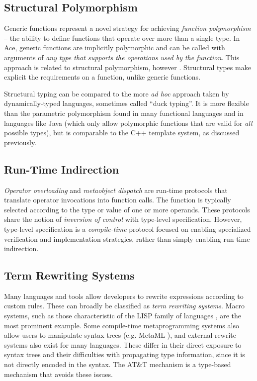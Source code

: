 \documentclass[9pt,preprint]{sigplanconf}
\begin{document}
\subsection{Structural Polymorphism}
Generic functions represent a novel strategy for achieving {\it function polymorphism} -- the ability to define functions that operate over more than a single type. In Ace, generic functions are implicitly polymorphic and can be called with arguments of {\it any type that supports the operations used by the function}. This approach is related to structural polymorphism, however \cite{malayeri2009structural}. Structural types make explicit the requirements on a function, unlike generic functions.

Structural typing can be compared to the more \emph{ad hoc} approach taken by dynamically-typed languages, sometimes called ``duck typing''. It is more flexible than the parametric polymorphism found in many functional languages and in languages like Java (which only allow polymorphic functions that are valid for {\it all} possible types), but is comparable to the C++ template system, as discussed previously.

\subsection{Run-Time Indirection}
{\it Operator overloading} \cite{vanWijngaarden:Mailloux:Peck:Koster:Sintzoff:Lindsey:Meertens:Fisker:acta:1975} and {\it metaobject dispatch} \cite{Kiczales91} are run-time protocols that translate operator invocations into function calls. The function is typically selected according to the type or value of one or more operands. These protocols share the notion of {\it inversion of control} with type-level specification. However, type-level specification is a {\it compile-time} protocol focused on enabling specialized verification and implementation strategies, rather than simply enabling run-time indirection.

\subsection{Term Rewriting Systems}
Many languages and tools allow developers to rewrite expressions according to custom rules. These can broadly be classified as {\it term rewriting systems}. Macro systems, such as those characteristic of the LISP family of languages \cite{mccarthy1978history}, are the most prominent example. Some compile-time metaprogramming systems also allow users to manipulate syntax trees (e.g. MetaML \cite{Sheard:1999:UMS}), and external rewrite systems also exist for many languages. These differ in their direct exposure to syntax trees and their difficulties with propagating type information, since it is not directly encoded in the syntax. The AT\&T mechanism is a type-based mechanism that avoids these issues.
\end{document}
